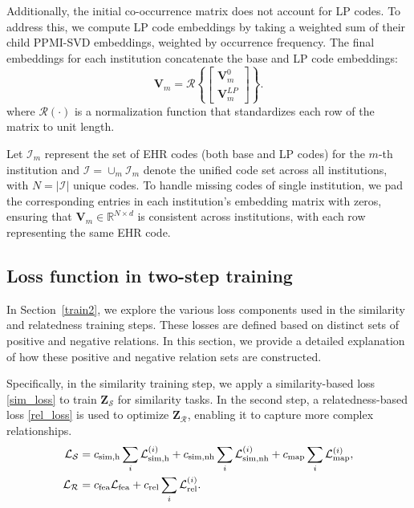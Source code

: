 \documentclass{article}
\def\Isc{\mathcal{I}}
\def\Rscr{\mathscr{R}}
\def\V{\mathbf{V}}
\def\Z{\mathbf{Z}}
\begin{document}
Additionally, the initial co-occurrence matrix does not account for LP codes. To address this, we compute LP code embeddings by taking a weighted sum of their child PPMI-SVD embeddings, weighted by occurrence frequency. The final embeddings for each institution concatenate the base and LP code embeddings:
\begin{equation}
    \V_{m} = \Rscr\left \{ \begin{bmatrix} \V_{m}^0 \\ \mathbf{V}_{m}^{LP} \end{bmatrix} \right \}.
    \label{PPMI_5}
\end{equation}
where $\Rscr(\cdot)$ is a normalization function that standardizes each row of the matrix to unit length.

Let $\Isc_m$ represent the set of EHR codes (both base and LP codes) for the $m$-th institution and $\Isc = \cup_{m} \Isc_m$ denote the unified code set across all institutions, with $N = |\Isc|$ unique codes. To handle missing codes of single institution, we pad the corresponding entries in each institution's embedding matrix with zeros, ensuring that $\mathbf{V}_{m} \in \mathbb{R}^{N \times d}$ is consistent across institutions, with each row representing the same EHR code. 

\subsection{Loss function in two-step training}
\label{loss}
In Section~\ref{train2}, we explore the various loss components used in the similarity and relatedness training steps. These losses are defined based on distinct sets of positive and negative relations. In this section, we provide a detailed explanation of how these positive and negative relation sets are constructed.

Specifically, in the similarity training step, we apply a similarity-based loss \eqref{sim_loss} to train $\Z_{\mathcal{S}}$ for similarity tasks. In the second step, a relatedness-based loss \eqref{rel_loss} is used to optimize $\Z_{\mathcal{R}}$, enabling it to capture more complex relationships.
\begin{align}
    \mathcal{L}_{\mathcal{S}} &= c_{\rm sim,h}\sum_{i} \mathcal{L}^{(i)}_{\rm sim,h} 
    + c_{\rm sim,nh}\sum_{i} \mathcal{L}^{(i)}_{\rm sim,nh} 
    + c_{\rm map} \sum_{i}\mathcal{L}^{(i)}_{\rm map}, 
    \label{sim_loss} \\
    \mathcal{L}_{\mathcal{R}} &= c_{\rm fea}\mathcal{L}_{\rm fea} 
    + c_{\rm rel}\sum_{i}\mathcal{L}^{(i)}_{\rm rel}.
    \label{rel_loss} 
\end{align}
\end{document}
